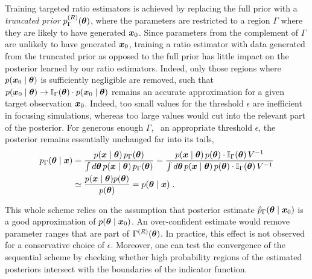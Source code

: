 Training targeted ratio estimators is achieved by replacing the full prior with a \emph{truncated prior} $p^{(R)}_{\Gamma}(\bm{\theta})$, where the parameters are restricted to a region $\Gamma$ where they are likely to have generated $\bm{x}_0$. Since parameters from the complement of $\Gamma$ are unlikely to have generated $\bm{x}_0$, training a ratio estimator with data generated from the truncated prior as opposed to the full prior has little impact on the posterior learned by our ratio estimators. Indeed, only those regions where $p(\bm{x}_0 \mid\bm{\theta})$ is sufficiently negligible are removed, such that $p(\bm{x}_0\mid\bm{\theta}) \to \mathbb{I}_\Gamma(\bm{\theta}) \cdot p(\bm{x}_0\mid\bm{\theta})$ remains an accurate approximation for a given target observation $\bm{x}_0$. Indeed, too small values for the threshold $\epsilon$ are inefficient in focusing simulations, whereas too large values would cut into the relevant part of the posterior. For generous enough $\Gamma$, \ie\ an appropriate threshold $\epsilon$, the posterior remains essentially unchanged far into its tails,
\begin{equation}
\begin{split}
    p_\Gamma(\bm{\theta}\mid\bm{x}) 
    &= \frac{p(\bm{x}\mid\bm{\theta})\,p_\Gamma(\bm{\theta})}{\int d\bm{\theta}\, p(\bm{x}\mid\bm{\theta})\, p_\Gamma(\bm{\theta})}
    = \frac{p(\bm{x}\mid\bm{\theta})\,p(\bm{\theta})\cdot\mathbb{I}_\Gamma(\bm{\theta})\, V^{-1}}
    {\int d\bm{\theta}\, p(\bm{x}\mid\bm{\theta})\,p(\bm{\theta})\cdot \mathbb{I}_\Gamma(\bm{\theta})\, V^{-1}} \\
    &\simeq \frac{p(\bm{x}\mid\bm{\theta})p(\bm{\theta})}{p(\bm{\theta})}
    = p(\bm{\theta}\mid\bm{x}) \;. 
\end{split}
\end{equation}


This whole scheme relies on the assumption that posterior estimate $\hat p_{\Gamma}(\bm{\theta} \mid \bm{x}_0)$ is a good approximation of $p(\bm{\theta} \mid \bm{x}_0)$. An over-confident estimate would remove parameter ranges that are part of $\Gamma^{(R)}(\bm{\theta})$. In practice, this effect is not observed for a conservative choice of $\epsilon$. Moreover, one can test the convergence of the sequential scheme by checking whether high probability regions of the estimated posteriors intersect with the boundaries of the indicator function.


